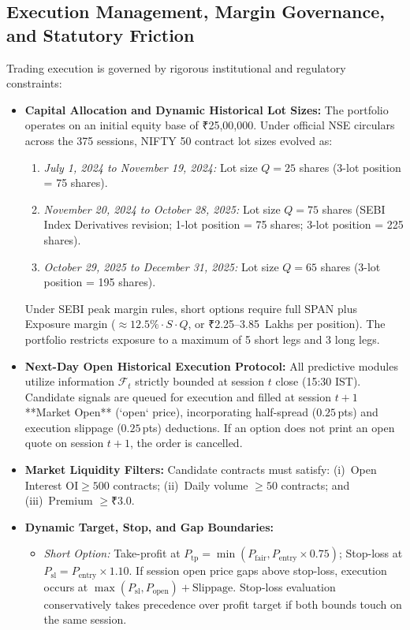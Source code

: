 \documentclass[journal]{IEEEtran}
\begin{document}
\subsection{Execution Management, Margin Governance, and Statutory Friction}
Trading execution is governed by rigorous institutional and regulatory constraints:
\begin{itemize}
    \item \textbf{Capital Allocation and Dynamic Historical Lot Sizes:}
    The portfolio operates on an initial equity base of ₹25,00,000. Under official NSE circulars across the 375 sessions, NIFTY 50 contract lot sizes evolved as:
    \begin{enumerate}
        \item \emph{July 1, 2024 to November 19, 2024:} Lot size $Q = 25$ shares (3-lot position = 75 shares).
        \item \emph{November 20, 2024 to October 28, 2025:} Lot size $Q = 75$ shares (SEBI Index Derivatives revision; 1-lot position = 75 shares; 3-lot position = 225 shares).
        \item \emph{October 29, 2025 to December 31, 2025:} Lot size $Q = 65$ shares (3-lot position = 195 shares).
    \end{enumerate}
    Under SEBI peak margin rules, short options require full SPAN plus Exposure margin ($\approx 12.5\% \cdot S \cdot Q$, or ₹2.25--3.85~Lakhs per position). The portfolio restricts exposure to a maximum of 5 short legs and 3 long legs.
    \item \textbf{Next-Day Open Historical Execution Protocol:}
    All predictive modules utilize information $\mathcal{F}_{t}$ strictly bounded at session $t$ close (15:30 IST). Candidate signals are queued for execution and filled at session $t+1$ **Market Open** (`open` price), incorporating half-spread ($0.25$\,pts) and execution slippage ($0.25$\,pts) deductions. If an option does not print an open quote on session $t+1$, the order is cancelled.
    \item \textbf{Market Liquidity Filters:} Candidate contracts must satisfy: (i)~Open Interest $\mathrm{OI} \ge 500$ contracts; (ii)~Daily volume $\ge 50$ contracts; and (iii)~Premium $\ge ₹3.0$.
    \item \textbf{Dynamic Target, Stop, and Gap Boundaries:}
    \begin{itemize}
        \item \emph{Short Option:} Take-profit at $P_{\mathrm{tp}} = \min(P_{\mathrm{fair}}, P_{\mathrm{entry}} \times 0.75)$; Stop-loss at $P_{\mathrm{sl}} = P_{\mathrm{entry}} \times 1.10$. If session open price gaps above stop-loss, execution occurs at $\max(P_{\mathrm{sl}}, P_{\mathrm{open}}) + \text{Slippage}$. Stop-loss evaluation conservatively takes precedence over profit target if both bounds touch on the same session.

\end{itemize}
\end{itemize}
\end{document}
